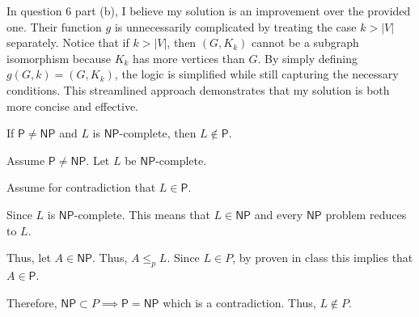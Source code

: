\documentclass[12pt, letterpaper]{article}
\renewcommand{\P}{\mathsf{P}}
\newcommand{\NP}{\mathsf{NP}}
\begin{document}
\color{\TextColor}
\pagecolor{\colormode}
\setlength{\parindent}{0pt}
\pagestyle{fancy}
\fancyhf{}
\fancyhead[ROE]{\color{\TextColor}\thepage}

\begin{solution}
    In question 6 part (b), I believe my solution is an improvement over the provided one. Their function \( g \) is unnecessarily complicated by treating the case \( k > |V| \) separately. Notice that if \( k > |V| \), then \((G, K_k)\) cannot be a subgraph isomorphism because \(K_k\) has more vertices than \(G\). By simply defining \( g(G, k) = (G, K_k) \), the logic is simplified while still capturing the necessary conditions. This streamlined approach demonstrates that my solution is both more concise and effective.
\end{solution}


\begin{subproblem}{}
    If $\P \neq \NP$ and $L$ is $\NP$-complete, then $L \notin \P$.
\end{subproblem}
\begin{problemproof}
    Assume $\P \neq \NP$. Let $L$ be $\NP$-complete.

    Assume for contradiction that $L \in \P$.

    Since $L$ is $\NP$-complete. This means that $L \in \NP$ and every $\NP$ problem reduces to $L$.

    Thus, let $A \in \NP$. Thus, $A \leq_p L$. Since $L \in P$, by proven in class this implies that $A \in \P$.

    Therefore, $\NP \subset P \implies \P = \NP$ which is a contradiction. Thus, $L \notin P$.
\end{problemproof}
\end{document}
